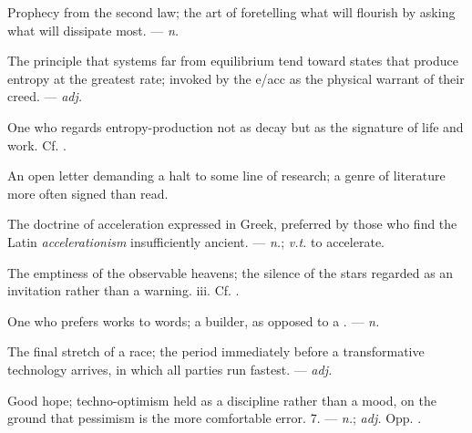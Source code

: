 Prophecy from the second law; the art of foretelling what will flourish by asking what will dissipate most. ---  \textit{n.}

 The principle that systems far from equilibrium tend toward states that produce entropy at the greatest rate; invoked by the e/acc as the physical warrant of their creed. ---  \textit{adj.}

 One who regards entropy-production not as decay but as the signature of life and work.  Cf. .

 An open letter demanding a halt to some line of research; a genre of literature more often signed than read.  

 The doctrine of acceleration expressed in Greek, preferred by those who find the Latin \textit{accelerationism} insufficiently ancient. ---  \textit{n.};  \textit{v.t.} to accelerate.

 The emptiness of the observable heavens; the silence of the stars regarded as an invitation rather than a warning.   iii. Cf. .

 One who prefers works to words; a builder, as opposed to a . ---  \textit{n.}

 The final stretch of a race; the period immediately before a transformative technology arrives, in which all parties run fastest. ---  \textit{adj.}

 Good hope; techno-optimism held as a discipline rather than a mood, on the ground that pessimism is the more comfortable error.   7. ---  \textit{n.};  \textit{adj.} Opp. .

